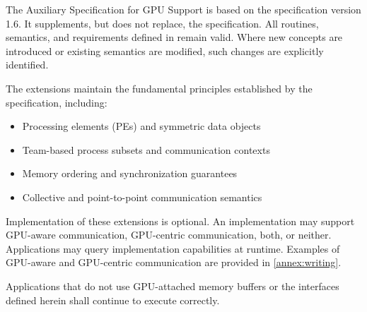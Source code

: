 
The \openshmem Auxiliary Specification for GPU Support is based on the
\openshmem specification version 1.6. It supplements, but does not replace, the
 specification. All routines, semantics, and requirements defined
in  remain valid. Where new concepts are introduced or existing
semantics are modified, such changes are explicitly identified.

The extensions maintain the fundamental principles established by the \openshmem
specification, including:
\begin{itemize}
\item Processing elements (\acp{PE}) and symmetric data objects
\item Team-based process subsets and communication contexts
\item Memory ordering and synchronization guarantees
\item Collective and point-to-point communication semantics
\end{itemize}

Implementation of these extensions is optional. An \openshmem implementation may
support GPU-aware communication, GPU-centric communication, both, or neither.
Applications may query implementation capabilities at runtime.
Examples of GPU-aware and GPU-centric communication are provided in
\cref{annex:writing}.

Applications that do not use GPU-attached memory buffers or the interfaces
defined herein shall continue to execute correctly.

